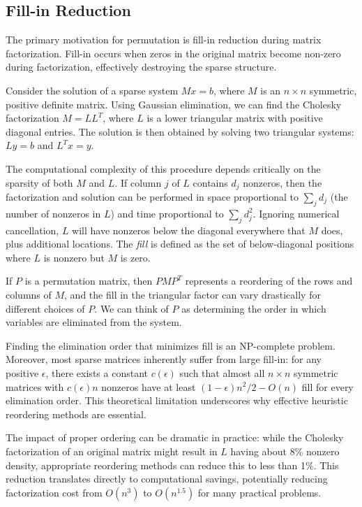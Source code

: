\subsection{Fill-in Reduction}
The primary motivation for permutation is fill-in reduction during matrix factorization. Fill-in occurs when zeros in the original matrix become non-zero during factorization, effectively destroying the sparse structure. 

Consider the solution of a sparse system $Mx = b$, where $M$ is an $n \times n$ symmetric, positive definite matrix. Using Gaussian elimination, we can find the Cholesky factorization $M = LL^T$, where $L$ is a lower triangular matrix with positive diagonal entries. The solution is then obtained by solving two triangular systems: $Ly = b$ and $L^Tx = y$.

The computational complexity of this procedure depends critically on the sparsity of both $M$ and $L$. If column $j$ of $L$ contains $d_j$ nonzeros, then the factorization and solution can be performed in space proportional to $\sum_j d_j$ (the number of nonzeros in $L$) and time proportional to $\sum_j d_j^2$. Ignoring numerical cancellation, $L$ will have nonzeros below the diagonal everywhere that $M$ does, plus additional locations. The \emph{fill} is defined as the set of below-diagonal positions where $L$ is nonzero but $M$ is zero.

If $P$ is a permutation matrix, then $PMP^T$ represents a reordering of the rows and columns of $M$, and the fill in the triangular factor can vary drastically for different choices of $P$. We can think of $P$ as determining the order in which variables are eliminated from the system.

Finding the elimination order that minimizes fill is an NP-complete problem. Moreover, most sparse matrices inherently suffer from large fill-in: for any positive $\epsilon$, there exists a constant $c(\epsilon)$ such that almost all $n \times n$ symmetric matrices with $c(\epsilon)n$ nonzeros have at least $(1-\epsilon)n^2/2 - O(n)$ fill for every elimination order. This theoretical limitation underscores why effective heuristic reordering methods are essential.

The impact of proper ordering can be dramatic in practice: while the Cholesky factorization of an original matrix might result in $L$ having about 8\% nonzero density, appropriate reordering methods can reduce this to less than 1\%. This reduction translates directly to computational savings, potentially reducing factorization cost from $O(n^3)$ to $O(n^{1.5})$ for many practical problems.

